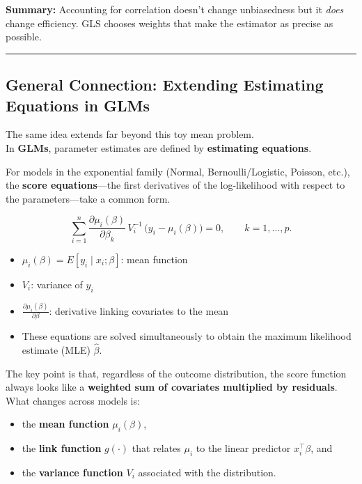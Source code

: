 \documentclass[
  letterpaper,
  DIV=11,
  numbers=noendperiod]{scrreprt}
\providecommand{\tightlist}{%
  \setlength{\itemsep}{0pt}\setlength{\parskip}{0pt}}\usepackage{longtable,booktabs,array}
\begin{document}
\textbf{Summary:} Accounting for correlation doesn't change unbiasedness
but it \emph{does} change efficiency. GLS chooses weights that make the
estimator as precise as possible.

\begin{center}\rule{0.5\linewidth}{0.5pt}\end{center}

\hypertarget{general-connection-extending-estimating-equations-in-glms}{%
\subsection*{General Connection: Extending Estimating Equations in
GLMs}\label{general-connection-extending-estimating-equations-in-glms}}

The same idea extends far beyond this toy mean problem.\\
In \textbf{GLMs}, parameter estimates are defined by \textbf{estimating
equations}.

For models in the exponential family (Normal, Bernoulli/Logistic,
Poisson, etc.), the \textbf{score equations}---the first derivatives of
the log-likelihood with respect to the parameters---take a common form.

\[
\sum_{i=1}^n 
\frac{\partial \mu_i(\beta)}{\partial \beta_k}\,
V_i^{-1}\,
\big(y_i - \mu_i(\beta)\big) = 0, 
\qquad k=1,\dots,p.
\]

\begin{itemize}
\tightlist
\item
  \(\mu_i(\beta)=E[y_i\mid x_i;\beta]\): mean function\\
\item
  \(V_i\): variance of \(y_i\)\\
\item
  \(\tfrac{\partial \mu_i(\beta)}{\partial \beta}\): derivative linking
  covariates to the mean\\
\item
  These equations are solved simultaneously to obtain the maximum
  likelihood estimate (MLE) \(\hat\beta\).
\end{itemize}

The key point is that, regardless of the outcome distribution, the score
function always looks like a \textbf{weighted sum of covariates
multiplied by residuals}. What changes across models is:

\begin{itemize}
\tightlist
\item
  the \textbf{mean function} \(\mu_i(\beta)\),\\
\item
  the \textbf{link function} \(g(\cdot)\) that relates \(\mu_i\) to the
  linear predictor \(x_i^\top \beta\), and\\
\item
  the \textbf{variance function} \(V_i\) associated with the
  distribution.
\end{itemize}
\end{document}
